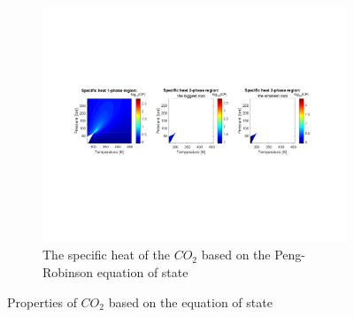 \documentclass[../Article_Model_Parameters.tex]{subfiles}
\begin{document}
\begin{figure}[H]
\begin{subfigure}[b]{0.95\textwidth}
                \label{fig: SFE_Properties_Density}
			\end{subfigure}
			\hfill
			\begin{subfigure}[b]{0.95\textwidth}
				\centering
				\includegraphics[trim = 2.9cm 7cm 3.cm 7cm,clip,width=\textwidth]{Figures/CP.pdf}	
				\caption{The specific heat of the $CO_2$ based on the Peng-Robinson equation of state}
                \label{fig: SFE_Properties_CP}
			\end{subfigure}
			\caption{Properties of $CO_2$ based on the equation of state}
			\label{fig: SFE_Properties}
		\end{figure}    
\end{document}

